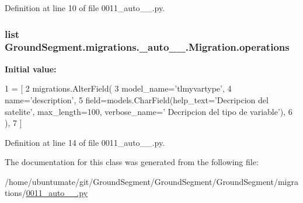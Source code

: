 Definition at line 10 of file 0011\+\_\+auto\+\_\+\_.\+py.

\hypertarget{class_ground_segment_1_1migrations_1_10011__auto__20161127__2019_1_1_migration_aa243936ecd74c7dd0820388603605312}{}
\subsubsection[{operations}]{\setlength{\rightskip}{0pt plus 5cm}list Ground\+Segment.\+migrations.\+\_\+auto\+\_\+\_.\+Migration.\+operations\hspace{0.3cm}{\ttfamily [static]}}\label{class_ground_segment_1_1migrations_1_10011__auto__20161127__2019_1_1_migration_aa243936ecd74c7dd0820388603605312}
{\bfseries Initial value\+:}
\begin{DoxyCode}
1 = [
2         migrations.AlterField(
3             model\_name=\textcolor{stringliteral}{'tlmyvartype'},
4             name=\textcolor{stringliteral}{'description'},
5             field=models.CharField(help\_text=\textcolor{stringliteral}{'Decripcion del satelite'}, max\_length=100, verbose\_name=\textcolor{stringliteral}{'
      Decripcion del tipo de variable'}),
6         ),
7     ]
\end{DoxyCode}


Definition at line 14 of file 0011\+\_\+auto\+\_\+\_.\+py.



The documentation for this class was generated from the following file\+:\begin{DoxyCompactItemize}
\item 
/home/ubuntumate/git/\+Ground\+Segment/\+Ground\+Segment/\+Ground\+Segment/migrations/\hyperlink{0011__auto__20161127__2019_8py}{0011\+\_\+auto\+\_\+\_.\+py}\end{DoxyCompactItemize}

